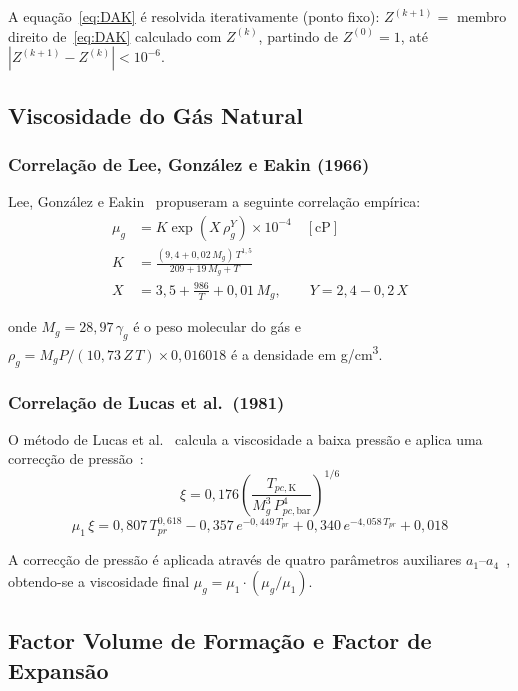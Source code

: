 \documentclass[12pt,a4paper]{article}
\begin{document}
A equação~\eqref{eq:DAK} é resolvida iterativamente (ponto fixo):
$Z^{(k+1)} = $ membro direito de~\eqref{eq:DAK} calculado com $Z^{(k)}$,
partindo de $Z^{(0)}=1$, até $|Z^{(k+1)}-Z^{(k)}|<10^{-6}$.

\subsection{Viscosidade do Gás Natural}

\subsubsection{Correlação de Lee, González e Eakin (1966)}

Lee, González e Eakin~\cite{LGE1966} propuseram a seguinte correlação empírica:
\begin{align}
  \mu_g &= K \exp\!\left(X\,\rho_g^Y\right) \times 10^{-4} \quad [\text{cP}]\\
  K &= \frac{(9{,}4 + 0{,}02\,M_g)\,T^{1{,}5}}{209 + 19\,M_g + T}\\
  X &= 3{,}5 + \frac{986}{T} + 0{,}01\,M_g, \qquad Y = 2{,}4 - 0{,}2\,X
\end{align}

onde $M_g = 28{,}97\,\gamma_g$ é o peso molecular do gás e
$\rho_g = M_g P/(10{,}73\,Z\,T)\times 0{,}016018$ é a densidade em
g/cm\textsuperscript{3}.

\subsubsection{Correlação de Lucas et al.\ (1981)}

O método de Lucas et al.~\cite{Lucas1981} calcula a viscosidade a baixa pressão e aplica uma correcção
de pressão~\cite{Ahmed2010}:
\begin{equation}
  \xi = 0{,}176\left(\frac{T_{pc,\text{K}}}{M_g^3\,P_{pc,\text{bar}}^4}\right)^{1/6}
\end{equation}
\begin{equation}
  \mu_1\,\xi = 0{,}807\,T_{pr}^{0{,}618}
               - 0{,}357\,e^{-0{,}449\,T_{pr}}
               + 0{,}340\,e^{-4{,}058\,T_{pr}} + 0{,}018
\end{equation}

A correcção de pressão é aplicada através de quatro parâmetros auxiliares
$a_1$--$a_4$~\cite{Ahmed2010}, obtendo-se a viscosidade final $\mu_g = \mu_1\cdot(\mu_g/\mu_1)$.

\subsection{Factor Volume de Formação e Factor de Expansão}
\end{document}
